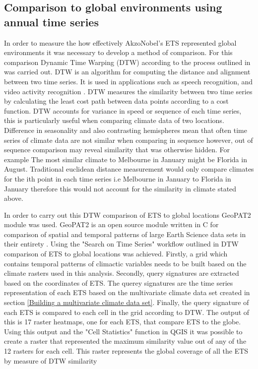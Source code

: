 \documentclass{article}
\begin{document}
\subsection{Comparison to global environments using annual time series}\label{etsvsglobe}
In order to measure the how effectively AkzoNobel's ETS represented global environments it was necessary to develop a method of comparison. For this comparison Dynamic Time Warping (DTW) according to the process outlined in \citet{Netzel2016} was carried out. DTW is an algorithm for computing the distance and alignment between two time series. It is used in applications such as speech recognition, and video activity recognition \citep{Seto}.  DTW measures the similarity between two time series by calculating the least cost path between data points according to a cost function. DTW accounts for variance in speed or sequence of each time series, this is particularly useful when comparing climate data of two locations. Difference in seasonality and also contrasting hemispheres mean that often time series of climate data are not similar when comparing in sequence however, out of sequence comparison may reveal similarity that was otherwise hidden. For example The most similar climate to Melbourne in January might be Florida in August. Traditional euclidean distance measurement would only compare climates for the ith point in each time series i.e Melbourne in January to Florida in January therefore this would not account for the similarity in climate stated above.

In order to carry out this DTW comparison of ETS to global locations GeoPAT2 module was used. GeoPAT2 is an open source module written in C for comparison of spatial and temporal patterns of large Earth Science data sets in their entirety \citep{Nowosad}. Using the "Search on Time Series" workflow outlined in \citet{Nowosad} DTW comparison of ETS to global locations was achieved. Firstly, a grid which contains temporal patterns of climactic variables needs to be built based on the climate rasters used in this analysis. Secondly, query signatures are extracted based on the coordinates of ETS. The querey signatures are the time series representation of each ETS based on the multivariate climate data set created in section \ref{Building a multivariate climate data set}. Finally, the query signature of each ETS is compared to each cell in the grid according to DTW. The output of this is 17 raster heatmaps, one for each ETS, that compare ETS to the globe. Using this output and the "Cell Statistics" function in QGIS it was possible to create a raster that represented the maximum similarity value out of any of the 12 rasters for each cell. This raster represents the global coverage of all the ETS by measure of DTW similarity 
\end{document}
